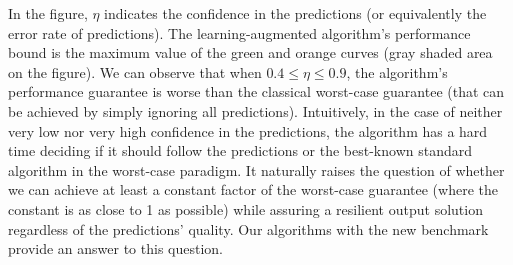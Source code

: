 In the figure, $\eta$ indicates the confidence in the predictions (or equivalently the error rate of predictions). The learning-augmented algorithm's performance bound is the maximum value of the green and orange curves (gray shaded area on the figure). We can observe that when $0.4 \leq \eta \leq 0.9$,
the algorithm's performance guarantee is worse than the classical worst-case guarantee (that can be achieved by simply ignoring all predictions).
Intuitively, in the case of neither very low nor very high confidence in the predictions, the algorithm has a hard time deciding if it should follow the predictions or the best-known standard algorithm in the worst-case paradigm.
It naturally raises the question of whether we can achieve at least a constant factor of the worst-case guarantee (where the constant is as close to 1 as possible) while assuring a resilient output solution regardless of the predictions' quality.
Our algorithms with the new benchmark provide an answer to this question.








